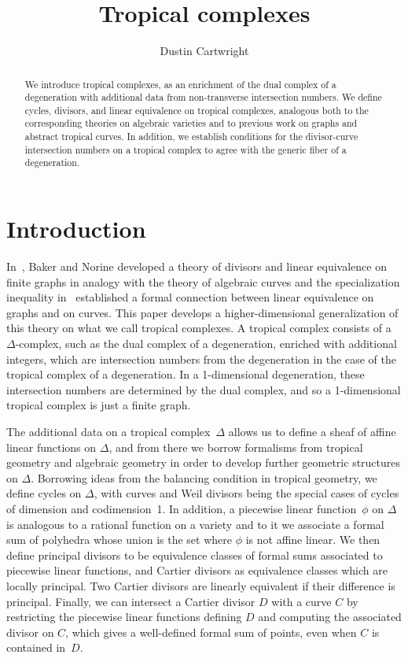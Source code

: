 \documentclass[11pt,reqno]{amsart}
\title{Tropical complexes}
\author{Dustin Cartwright}
\theoremstyle{definition}
\begin{document}
\begin{abstract}
We introduce tropical complexes, as an enrichment of the dual complex of a degeneration with additional data from non-transverse intersection numbers. We define cycles, divisors, and linear equivalence on tropical complexes, analogous both to the corresponding theories on algebraic varieties and to previous work on graphs and abstract tropical curves. In addition, we establish conditions for the divisor-curve intersection numbers on a tropical complex to agree with the generic fiber of a degeneration.
\end{abstract}
\maketitle

\section{Introduction}

In~\cite{baker-norine}, Baker and Norine developed a theory of divisors and
linear equivalence on finite graphs in analogy with the theory of algebraic
curves and the specialization inequality in~\cite{baker} established a formal
connection between linear equivalence on graphs and on curves. This paper
develops a higher-dimensional generalization of this theory on what we call
tropical complexes. A tropical complex consists of a $\Delta$-complex, such as
the dual complex of a degeneration, enriched with additional integers, which are
intersection numbers from the degeneration in the case of the tropical complex
of a degeneration. In a 1-dimensional degeneration, these intersection numbers
are determined by the dual complex, and so a 1-dimensional tropical complex is
just a finite graph.

The additional data on a tropical complex~$\Delta$ allows us to define a sheaf
of affine linear functions on $\Delta$, and from there we borrow formalisms from
tropical geometry and algebraic geometry in order to develop further geometric
structures on $\Delta$. Borrowing ideas from the balancing condition in tropical
geometry, we define cycles on $\Delta$, with curves and Weil divisors being the
special cases of cycles of dimension and codimension~1. In addition, a piecewise
linear function~$\phi$ on $\Delta$ is analogous to a rational function on a
variety and to it we associate a formal sum of polyhedra whose union is the set
where $\phi$ is not affine linear. We then define principal divisors to be
equivalence classes of formal sums associated to piecewise linear functions, and
Cartier divisors as equivalence classes which are locally principal. Two Cartier
divisors are linearly equivalent if their difference is principal. Finally, we
can intersect a Cartier divisor $D$ with a curve $C$ by restricting the
piecewise linear functions defining $D$ and computing the associated divisor on
$C$, which gives a well-defined formal sum of points, even when $C$ is contained
in~$D$.
\end{document}
